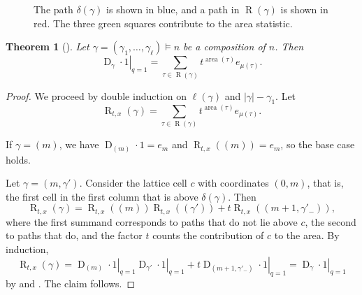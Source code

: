 \documentclass[reqno]{amsart}
\theoremstyle{plain}
\newtheorem{theorem}{Theorem}[section]
\theoremstyle{definition}
\theoremstyle{remark}
\DeclareMathOperator{\D}{D}
\DeclareMathOperator{\R}{R}
\DeclareMathOperator{\area}{area}
\newcommand{\<}{\langle}
\renewcommand{\>}{\rangle}
\begin{document}
\begin{figure}[ht]
    \centering
    \caption{The path $\delta(\gamma)$ is shown in blue, and a path in $\R(\gamma)$ is shown in red. The three green squares contribute to the area statistic.}
    \label{fig:small-path-example}
\end{figure}

\begin{theorem}[{\cite[Equation~(148)]{BHMPS2023ShuffleAnyLine}}]
    \label{thm:D.1_comb}
    Let $\gamma=(\gamma_1,\dots,\gamma_\ell)\vDash n$ be a composition of $n$. Then
    \[
        \left.\D_\gamma\cdot1\right\rvert_{q=1} = \sum_{\tau\in \R(\gamma)} t^{\area(\tau)} e_{\mu(\tau)}.
    \]
\end{theorem}

\begin{proof}
    We proceed by double induction on $\ell(\gamma)$ and $\lvert \gamma \rvert - \gamma_1$. Let \[ \R_{t,x}(\gamma) = \sum_{\tau \in \R(\gamma)} t^{\area(\tau)} e_{\mu(\tau)}. \]

    If $\gamma = (m)$, we have $\D_{(m)} \cdot 1 = e_m$ and $\R_{t,x}((m)) = e_m$, so the base case holds.

    Let $\gamma = (m, \gamma')$. Consider the lattice cell $c$ with coordinates $(0, m)$, that is, the first cell in the first column that is above $\delta(\gamma)$.
    Then \[ \R_{t,x}(\gamma) = \R_{t,x}((m))\R_{t,x}((\gamma')) + t \R_{t,x}((m+1, \gamma'_-)), \] where the first summand corresponds to paths that do not lie above $c$, the second to paths that do, and the factor $t$ counts the contribution of $c$ to the area. By induction,
    \[
        \R_{t,x}(\gamma) = \left. \D_{(m)} \cdot 1 \right\rvert_{q=1} \left. \D_{\gamma'} \cdot 1 \right\rvert_{q=1} + t \left. \D_{(m+1, \gamma'_-)} \cdot 1 \right\rvert_{q=1}
        = \left. \D_\gamma \cdot 1 \right\rvert_{q=1}
    \]
    by  and . The claim follows.
\end{proof}
\end{document}
